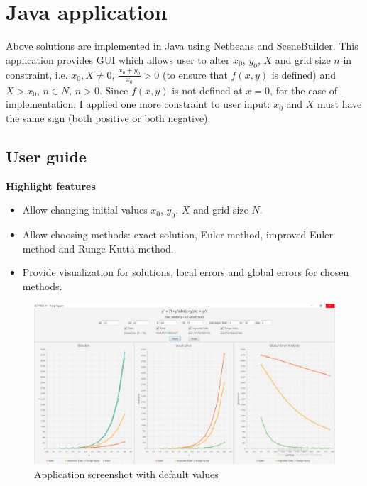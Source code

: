 \section{Java application}
\label{chapter2}

Above solutions are implemented in Java using Netbeans and SceneBuilder. This application provides GUI which allows user to alter $x_0$, $y_0$, $X$ and grid size $n$ in constraint, i.e. $x_0, X \neq 0$, $\frac{x_0+y_0}{x_0} > 0$ (to ensure that $f(x,y)$ is defined) and $X > x_0$, $n\in N$, $n > 0$. Since $f(x,y)$ is not defined at $x=0$, for the ease of implementation, I applied one more constraint to user input: $x_0$ and $X$ must have the same sign (both positive or both negative).

\subsection{User guide}

\textbf{Highlight features}
\begin{itemize}  
\item Allow changing initial values $x_0$, $y_0$, $X$ and grid size $N$.
\item Allow choosing methods: exact solution, Euler method, improved Euler method and Runge-Kutta method.
\item Provide visualization for solutions, local errors and global errors for chosen methods.
\end{itemize}

\begin{figure}[H]
	\centering
	\includegraphics[width=\linewidth]{image/full.png}
	\caption{Application screenshot with default values}
	\label{fig:applicationscreenshot}
\end{figure}

